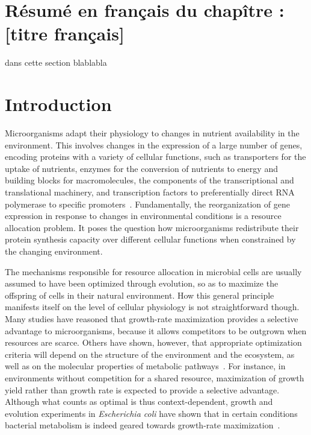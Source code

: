 \section*{Résumé en français du chapître \thechapter : [titre français]}
dans cette section blablabla



\section{Introduction}

Microorganisms adapt their physiology to changes in nutrient availability in the environment.
This involves changes in the expression of a large number of genes, encoding proteins with a variety of cellular functions, such as transporters for the uptake of nutrients, enzymes for the conversion of nutrients to energy and building blocks for macromolecules, the components of the transcriptional and translational machinery, and transcription factors to preferentially direct RNA polymerase to specific promoters~\cite{schaechter_microbe_2006,keseler_ecocyc_2013}.
Fundamentally, the reorganization of gene expression in response to changes in environmental conditions is a resource allocation problem.
It poses the question how microorganisms redistribute their protein synthesis capacity over different cellular functions when constrained by the changing environment.

The mechanisms responsible for resource allocation in microbial cells are usually assumed to have been optimized through evolution, so as to maximize the offspring of cells in their natural environment.
How this general principle manifests itself on the level of cellular physiology is not straightforward though.
Many studies have reasoned that growth-rate maximization provides a selective advantage to microorganisms, because it allows competitors to be outgrown when resources are scarce.
Others have shown, however, that appropriate optimization criteria will depend on the structure of the environment and the ecosystem, as well as on the molecular properties of metabolic pathways~\cite{frank_tradeoff_2010,maclean_tragedy_2008,schuetz_multidimensional_2012,schuster_maximization_2008,schuetz_systematic_2007}.
For instance,  in environments without competition for a shared resource, maximization of growth yield rather than growth rate is expected to provide a selective advantage.
Although what counts as optimal is thus context-dependent, growth and evolution experiments in \textit{Escherichia coli} have shown that in certain conditions bacterial metabolism is indeed geared towards growth-rate maximization~\cite{edwards_silico_2001,ibarra_escherichia_2002,lewis_omic_2010}.

